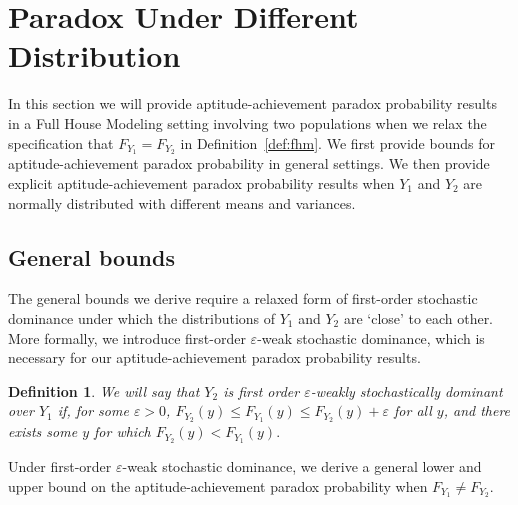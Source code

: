 \documentclass[12pt]{article}
\newtheorem{defn}[theorem]{Definition}
\begin{document}
\section{Paradox Under Different Distribution}
\label{sec:diffdist}

In this section we will provide aptitude-achievement paradox probability results in a Full House Modeling setting involving two populations when we relax the specification that $F_{Y_1} = F_{Y_2}$ in Definition~\ref{def:fhm}. We first provide bounds for aptitude-achievement paradox probability in general settings. We then provide explicit aptitude-achievement paradox probability results when $Y_1$ and $Y_2$ are normally distributed with different means and variances.


\subsection{General bounds}

The general bounds we derive require a relaxed form of first-order stochastic dominance under which the distributions of $Y_1$ and $Y_2$ are `close' to each other. More formally, we introduce first-order $\varepsilon$-weak stochastic dominance, which is necessary for our aptitude-achievement paradox probability results.

\begin{defn}\label{def:stodom}
We will say that $Y_2$ is first order $\varepsilon$-weakly stochastically dominant over $Y_1$ if, for some $\varepsilon > 0$, 
$
  F_{Y_2}(y) \leq F_{Y_1}(y) \leq F_{Y_2}(y) + \varepsilon
$
for all $y$, and there exists some $y$ for which 
$
  F_{Y_2}(y) < F_{Y_1}(y).
$
\end{defn}

Under first-order $\varepsilon$-weak stochastic dominance, we derive a general lower and upper bound on the aptitude-achievement paradox probability when $F_{Y_1}\neq F_{Y_2}$.
\end{document}
